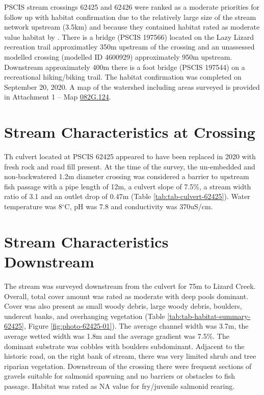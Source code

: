 \documentclass[
]{book}
\begin{document}
PSCIS stream crossings 62425 and 62426 were ranked as a moderate priorities for follow up with habitat confirmation due to the relatively large size of the stream network upstream (3.5km) and because they contained habitat rated as moderate value habitat by \citet{vastFishPassage2013}. There is a bridge (PSCIS 197566) located on the Lazy Lizard recreation trail approximatley 350m upstream of the crossing and an unassessed modelled crossing (modelled ID 4600929) approximately 950m upstream. Downstream approximately 400m there is a foot bridge (PSCIS 197544) on a recreational hiking/biking trail. The habitat confirmation was completed on September 20, 2020. A map of the watershed including areas surveyed is provided in Attachment 1 -- Map \href{https://hillcrestgeo.ca/outgoing/fishpassage/projects/elk/FishPassage_082G.124.pdf}{082G.124}.

\hypertarget{stream-characteristics-at-crossing-4}{%
\section*{Stream Characteristics at Crossing}\label{stream-characteristics-at-crossing-4}}

Th culvert located at PSCIS 62425 appeared to have been replaced in 2020 with fresh rock and road fill present. At the time of the survey, the un-embedded and non-backwatered 1.2m diameter crossing was considered a barrier to upstream fish passage with a pipe length of 12m, a culvert slope of 7.5\%, a stream width ratio of 3.1 and an outlet drop of 0.47m (Table \ref{tab:tab-culvert-62425}). Water temperature was 8\(^\circ\)C, pH was 7.8 and conductivity was 370uS/cm.

\hypertarget{stream-characteristics-downstream-4}{%
\section*{Stream Characteristics Downstream}\label{stream-characteristics-downstream-4}}

The stream was surveyed downstream from the culvert for 75m to Lizard Creek. Overall, total cover amount was rated as moderate with deep pools dominant. Cover was also present as small woody debris, large woody debris, boulders, undercut banks, and overhanging vegetation (Table \ref{tab:tab-habitat-summary-62425}, Figure \ref{fig:photo-62425-01}). The average channel width was 3.7m, the average wetted width was 1.8m and the average gradient was 7.5\%. The dominant substrate was cobbles with boulders subdominant. Adjacent to the historic road, on the right bank of stream, there was very limited shrub and tree riparian vegetation. Downstream of the crossing there were frequent sections of gravels suitable for salmonid spawning and no barriers or obstacles to fish passage. Habitat was rated as NA value for fry/juvenile salmonid rearing.
\end{document}
